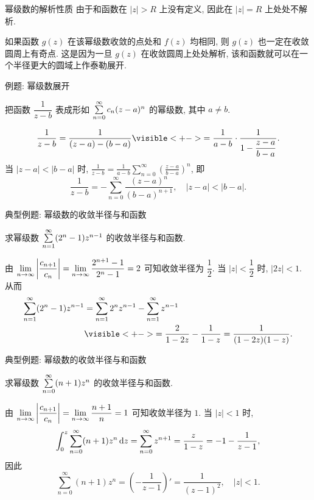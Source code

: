 \begin{frame}{幂级数的解析性质}
\onslide<+->
由于和函数在 $|z|>R$ 上没有定义, 因此在 $|z|=R$ 上处处不解析.

\onslide<+->
如果函数 $g(z)$ 在该幂级数收敛的点处和 $f(z)$ 均相同, 则 $g(z)$ 也\alert{一定在收敛圆周上有奇点}.
\onslide<+->
这是因为一旦 $g(z)$ 在收敛圆周上处处解析, 该和函数就可以在一个半径更大的圆域上作泰勒展开.
\end{frame}


\begin{frame}{例题: 幂级数展开}
\begin{example}
把函数 $\dfrac1{z-b}$ 表成形如 $\sum\limits_{n=0}^\infty c_n(z-a)^n$ 的幂级数, 其中 $a\neq b$.
\end{example}
\begin{solution}
\[\frac1{z-b}=\frac1{(z-a)-(b-a)}
\visible<+->{=\frac1{a-b}\cdot\frac1{1-\dfrac{z-a}{b-a}}.}\]
\onslide<+->
当 $|z-a|<|b-a|$ 时,
\onslide<+->
$\displaystyle\frac1{z-b}=\frac1{a-b}\sum_{n=0}^\infty\left(\frac{z-a}{b-a}\right)^n$,
\onslide<+->
即
\[\frac1{z-b}=-\sum_{n=0}^\infty\frac{(z-a)^n}{(b-a)^{n+1}},\quad|z-a|<|b-a|.\]
\vspace{-3pt}
\end{solution}
\end{frame}


\begin{frame}{典型例题: 幂级数的收敛半径与和函数}
\begin{example}
求幂级数 $\sum\limits_{n=1}^\infty(2^n-1)z^{n-1}$ 的收敛半径与和函数.
\end{example}
\begin{solution}
由 $\displaystyle\lim_{n\to\infty}\left|\frac{c_{n+1}}{c_n}\right|=\lim_{n\to\infty}\frac{2^{n+1}-1}{2^n-1}=2$ 可知收敛半径为 $\dfrac12$.
\onslide<+->
当 $|z|<\dfrac12$ 时, $|2z|<1$.
\onslide<+->
从而
\begin{align*}
\sum_{n=1}^\infty(2^n-1)z^{n-1}&=\sum_{n=1}^\infty 2^n z^{n-1}-\sum_{n=1}^\infty z^{n-1}\\
&\visible<+->{=\frac2{1-2z}-\frac1{1-z}=\frac1{(1-2z)(1-z)}.}
\end{align*}
\end{solution}
\end{frame}


\begin{frame}{典型例题: 幂级数的收敛半径与和函数}
\begin{example}
求幂级数 $\sum\limits_{n=0}^\infty(n+1)z^n$ 的收敛半径与和函数.
\end{example}
\begin{solution}
由 $\displaystyle\lim_{n\to\infty}\left|\frac{c_{n+1}}{c_n}\right|=\lim_{n\to\infty}\frac{n+1}n=1$ 可知收敛半径为 $1$.
\onslide<+->
当 $|z|<1$ 时,
\[\int_0^z\sum_{n=0}^\infty(n+1)z^n\,\mathrm{d} z=\sum_{n=0}^\infty z^{n+1}=\frac z{1-z}=-1-\frac1{z-1},\]
\onslide<+->
因此
\[\sum_{n=0}^\infty(n+1)z^n=\left(-\frac1{z-1}\right)'=\frac1{(z-1)^2},\quad |z|<1.\]
\vspace{-\baselineskip}
\end{solution}
\end{frame}


